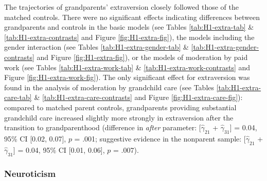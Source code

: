 \documentclass[
  english,
  man, noextraspace]{apa7}
\begin{document}
The trajectories of grandparents' extraversion closely followed those of the matched controls. There were no significant effects indicating differences between grandparents and controls in the basic models (see Tables \ref{tab:H1-extra-tab} \& \ref{tab:H1-extra-contrasts} and Figure \ref{fig:H1-extra-fig}), the models including the gender interaction (see Tables \ref{tab:H1-extra-gender-tab} \& \ref{tab:H1-extra-gender-contrasts} and Figure \ref{fig:H1-extra-fig}), or the models of moderation by paid work (see Tables \ref{tab:H1-extra-work-tab} \& \ref{tab:H1-extra-work-contrasts} and Figure \ref{fig:H1-extra-work-fig}). The only significant effect for extraversion was found in the analysis of moderation by grandchild care (see Tables \ref{tab:H1-extra-care-tab} \& \ref{tab:H1-extra-care-contrasts} and Figure \ref{fig:H1-extra-care-fig}): compared to matched parent controls, grandparents providing substantial grandchild care increased slightly more strongly in extraversion after the transition to grandparenthood (difference in \emph{after} parameter: {[}\(\hat{\gamma}_{21}\) + \(\hat{\gamma}_{31}\){]} = 0.04, 95\% CI {[}0.02, 0.07{]}, \(p\) = .001; suggestive evidence in the nonparent sample: {[}\(\hat{\gamma}_{21}\) + \(\hat{\gamma}_{31}\){]} = 0.04, 95\% CI {[}0.01, 0.06{]}, \(p\) = .007).

\hypertarget{neuroticism}{%
\subsubsection{Neuroticism}\label{neuroticism}}
\end{document}
